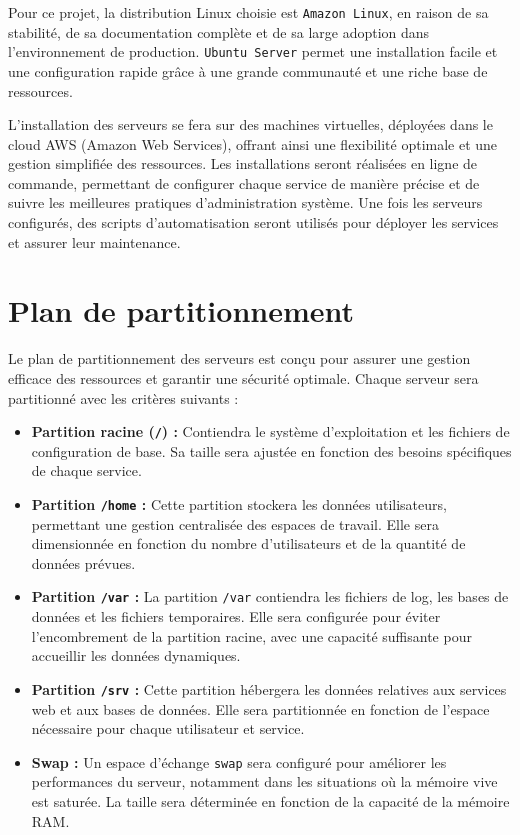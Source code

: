 \documentclass[a4paper, 12pt]{article}
\begin{document}
	Pour ce projet, la distribution Linux choisie est \texttt{Amazon Linux}, en raison de sa stabilité, de sa documentation complète et de sa large adoption dans l'environnement de production. \texttt{Ubuntu Server} permet une installation facile et une configuration rapide grâce à une grande communauté et une riche base de ressources.
	
	L'installation des serveurs se fera sur des machines virtuelles, déployées dans le cloud AWS (Amazon Web Services), offrant ainsi une flexibilité optimale et une gestion simplifiée des ressources. Les installations seront réalisées en ligne de commande, permettant de configurer chaque service de manière précise et de suivre les meilleures pratiques d'administration système. Une fois les serveurs configurés, des scripts d'automatisation seront utilisés pour déployer les services et assurer leur maintenance.
	
	\section{Plan de partitionnement}
	
	Le plan de partitionnement des serveurs est conçu pour assurer une gestion efficace des ressources et garantir une sécurité optimale. Chaque serveur sera partitionné avec les critères suivants :
	
	\begin{itemize}
		\item \textbf{Partition racine (\texttt{/}) :} Contiendra le système d'exploitation et les fichiers de configuration de base. Sa taille sera ajustée en fonction des besoins spécifiques de chaque service.
		\item \textbf{Partition \texttt{/home} :} Cette partition stockera les données utilisateurs, permettant une gestion centralisée des espaces de travail. Elle sera dimensionnée en fonction du nombre d'utilisateurs et de la quantité de données prévues.
		\item \textbf{Partition \texttt{/var} :} La partition \texttt{/var} contiendra les fichiers de log, les bases de données et les fichiers temporaires. Elle sera configurée pour éviter l'encombrement de la partition racine, avec une capacité suffisante pour accueillir les données dynamiques.
		\item \textbf{Partition \texttt{/srv} :} Cette partition hébergera les données relatives aux services web et aux bases de données. Elle sera partitionnée en fonction de l'espace nécessaire pour chaque utilisateur et service.
		\item \textbf{Swap :} Un espace d'échange \texttt{swap} sera configuré pour améliorer les performances du serveur, notamment dans les situations où la mémoire vive est saturée. La taille sera déterminée en fonction de la capacité de la mémoire RAM.
	\end{itemize}
	
\end{document}
